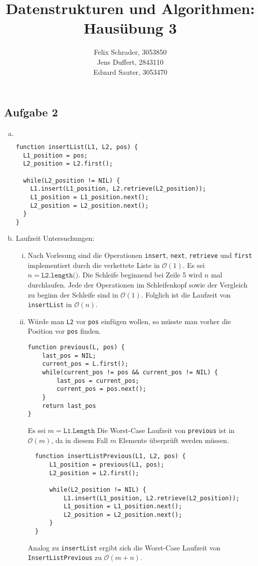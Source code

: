\documentclass[11pt]{article}
\author{
  Felix Schrader, 3053850 \\ 
  Jens Duffert, 2843110 \\
  Eduard Sauter, 3053470
}
\title{Datenstrukturen und Algorithmen: Haus\"ubung 3}
\begin{document}
\maketitle
\subsection*{Aufgabe 2}
\begin{enumerate}[a)]
  \item  $ $
\begin{center}
\begin{lstlisting}
function insertList(L1, L2, pos) {
  L1_position = pos;
  L2_position = L2.first();

  while(L2_position != NIL) {
    L1.insert(L1_position, L2.retrieve(L2_position));
    L1_position = L1_position.next();
    L2_position = L2_position.next();
  }
}
\end{lstlisting}
\end{center}
    
  \item Laufzeit Untersuchungen:
    \begin{enumerate}[i)]
      \item
        Nach Vorlesung sind die Operationen \texttt{insert}, \texttt{next}, 
        \texttt{retrieve} und \texttt{first} implementiert durch die verkettete
        Liste in $\mathcal{O}(1)$. Es sei $n=\texttt{L2.length()}$. 
        Die Schleife beginnend bei Zeile 5 wird $n$ mal durchlaufen. Jede der 
        Operationen im Schleifenkopf sowie der Vergleich zu beginn der Schleife
        sind in $\mathcal{O}(1)$. Folglich ist die Laufzeit von \texttt{insertList}
        in $\mathcal{O}(n)$.
      \item W\"urde man \texttt{L2} vor \texttt{pos} einf\"ugen wollen, so
        m\"usste man vorher die Position vor \texttt{pos} finden.
\begin{lstlisting}
function previous(L, pos) {
    last_pos = NIL;
    current_pos = L.first();
    while(current_pos != pos && current_pos != NIL) {
        last_pos = current_pos;
        current_pos = pos.next();
    }
    return last_pos
}
\end{lstlisting}
        Es sei $m=\texttt{L1.Length}$ 
        Die Worst-Case Laufzeit von \texttt{previous} ist in $\mathcal{O}(m)$,
        da in diesem Fall $m$ Elemente \"uberpr\"uft werden m\"ussen. 

\begin{lstlisting}
  function insertListPrevious(L1, L2, pos) {
      L1_position = previous(L1, pos);
      L2_position = L2.first();
  
      while(L2_position != NIL) {
          L1.insert(L1_position, L2.retrieve(L2_position));
          L1_position = L1_position.next();
          L2_position = L2_position.next();
      }
  }
\end{lstlisting}
        
        Analog zu \texttt{insertList} ergibt sich die Worst-Case Laufzeit von
        \texttt{InsertListPrevious} zu $\mathcal{O}(m + n)$.

  \end{enumerate}
\end{enumerate}
\end{document}
